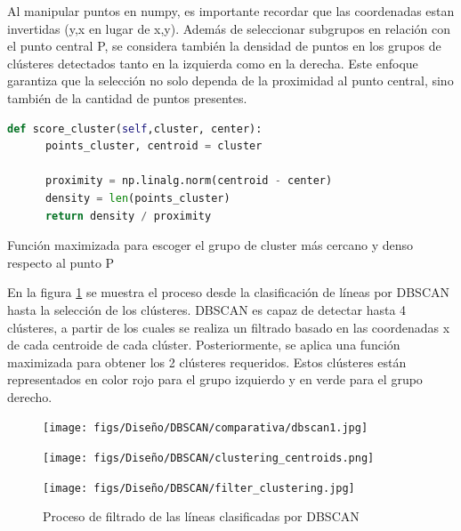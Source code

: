 Al manipular puntos en numpy, es importante recordar que las coordenadas estan invertidas (y,x en lugar de x,y). Además de seleccionar subgrupos en relación con el punto central P, 
se considera también la densidad de puntos en los grupos de clústeres detectados tanto en la izquierda como en la derecha. Este enfoque garantiza que la selección no solo dependa 
de la proximidad al punto central, sino también de la cantidad de puntos presentes.  \newline
\begin{code}[h]
  \begin{lstlisting}[language=Python]
    def score_cluster(self,cluster, center):
      points_cluster, centroid = cluster
    
      proximity = np.linalg.norm(centroid - center)
      density = len(points_cluster)
      return density / proximity

  \end{lstlisting}
  \caption[Función maximizada para escoger el grupo de cluster más cercano y denso respecto al punto P]{Función maximizada para escoger el grupo de cluster más cercano y denso respecto al punto P}
  \label{cod:funcion_maximizada}
  \end{code}  
 
  En la figura \ref{fig:comparativa} se muestra el proceso desde la clasificación de líneas por DBSCAN hasta la selección de los clústeres. 
  DBSCAN es capaz de detectar hasta 4 clústeres, a partir de los cuales se realiza un filtrado basado en las coordenadas x de cada centroide de cada clúster. Posteriormente, 
  se aplica una función maximizada para obtener los 2 clústeres requeridos. Estos clústeres están representados en color rojo para el grupo izquierdo y en verde para el grupo 
  derecho. 
  \begin{figure}[H]
    \centering
    \begin{minipage}{0.3\textwidth}
      \texttt{[image: figs/Diseño/DBSCAN/comparativa/dbscan1.jpg]}
    \end{minipage}
    \hfill
    \begin{minipage}{0.3\textwidth}
      \texttt{[image: figs/Diseño/DBSCAN/clustering\_centroids.png]}
    \end{minipage}
    \hfill
    \begin{minipage}{0.3\textwidth}
      \texttt{[image: figs/Diseño/DBSCAN/filter\_clustering.jpg]}
    \end{minipage}
    \caption{Proceso de filtrado de las líneas clasificadas por DBSCAN}
    \label{fig:comparativa}
  \end{figure}

